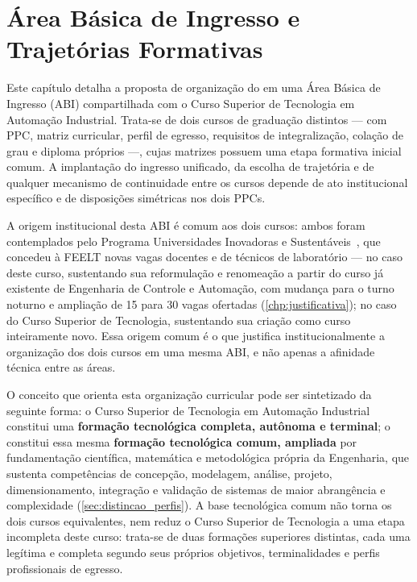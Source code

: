 \chapter{Área Básica de Ingresso e Trajetórias Formativas}
\label{chp:abi}

Este capítulo detalha a proposta de organização do \ppccurso em uma Área Básica de Ingresso (ABI) compartilhada com o Curso Superior de Tecnologia em Automação Industrial. Trata-se de dois cursos de graduação distintos — com PPC, matriz curricular, perfil de egresso, requisitos de integralização, colação de grau e diploma próprios —, cujas matrizes possuem uma etapa formativa inicial comum. A implantação do ingresso unificado, da escolha de trajetória e de qualquer mecanismo de continuidade entre os cursos depende de ato institucional específico e de disposições simétricas nos dois PPCs.

A origem institucional desta ABI é comum aos dois cursos: ambos foram contemplados pelo Programa Universidades Inovadoras e Sustentáveis~\cite{programa_universidades_inovadoras_sustentaveis}, que concedeu à FEELT novas vagas docentes e de técnicos de laboratório — no caso deste curso, sustentando sua reformulação e renomeação a partir do curso já existente de Engenharia de Controle e Automação, com mudança para o turno noturno e ampliação de 15 para 30 vagas ofertadas (\autoref{chp:justificativa}); no caso do Curso Superior de Tecnologia, sustentando sua criação como curso inteiramente novo. Essa origem comum é o que justifica institucionalmente a organização dos dois cursos em uma mesma ABI, e não apenas a afinidade técnica entre as áreas.

O conceito que orienta esta organização curricular pode ser sintetizado da seguinte forma: o Curso Superior de Tecnologia em Automação Industrial constitui uma \textbf{formação tecnológica completa, autônoma e terminal}; o \ppccurso constitui essa mesma \textbf{formação tecnológica comum, ampliada} por fundamentação científica, matemática e metodológica própria da Engenharia, que sustenta competências de concepção, modelagem, análise, projeto, dimensionamento, integração e validação de sistemas de maior abrangência e complexidade (\autoref{sec:distincao_perfis}). A base tecnológica comum não torna os dois cursos equivalentes, nem reduz o Curso Superior de Tecnologia a uma etapa incompleta deste curso: trata-se de duas formações superiores distintas, cada uma legítima e completa segundo seus próprios objetivos, terminalidades e perfis profissionais de egresso.

